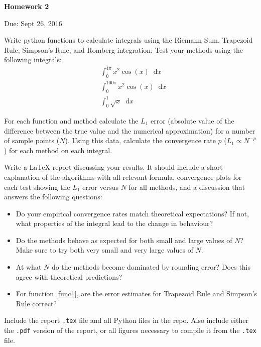 \documentclass{article}
\newcommand*\diff{\mathop{}\!\mathrm{d}}
\begin{document}
\begin{center}

\vspace*{-2.5cm}
\LARGE
\bf{Homework 2}
\vspace{1cm}

\large{Due: Sept 26, 2016}
\vspace{1cm}

\end{center}

Write python functions to calculate integrals using the Riemann Sum, Trapezoid Rule, Simpson's Rule, and Romberg integration.  Test your methods using the following integrals:
\begin{align}
& \int_0^{4\pi} x^2 \cos(x) \diff x \label{func1}\\
& \int_0^{100\pi} x^2 \cos(x) \diff x \\
& \int_0^1 \sqrt{x} \diff x 
\end{align}

For each function and method calculate the $L_1$ error (absolute value of the difference between the true value and the numerical approximation) for a number of sample points ($N$).  Using this data, calculate the convergence rate $p$ ($L_1 \propto N^{-p}$) for each method on each integral.

Write a \LaTeX{}  report discussing your results. It should include a short explanation of the algorithms with all relevant formula, convergence plots for each test showing the $L_1$ error versus $N$ for all methods, and a discussion that answers the following questions:
\begin{itemize}
	\item Do your empirical convergence rates match theoretical expectations? If not, what properties of the integral lead to the change in behaviour?
	\item Do the methods behave as expected for both small and large values of $N$?  Make sure to try both very small and very large values of $N$.
	\item At what $N$ do the methods become dominated by rounding error?  Does this agree with theoretical predictions?
	\item For function \eqref{func1}, are the error estimates for Trapezoid Rule and Simpson's Rule correct?
\end{itemize}

Include the report \texttt{.tex} file and all Python files in the repo.  Also include either the \texttt{.pdf} version of the report, or all figures necessary to compile it from the \texttt{.tex} file.
\end{document}
